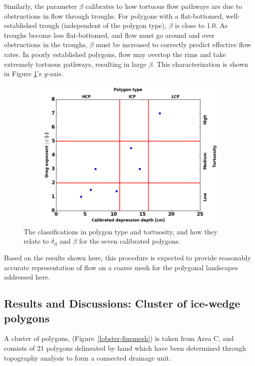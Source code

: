 \documentclass[review,11pt]{elsarticle}
\begin{document}
Similarly, the parameter $\beta$ calibrates to how tortuous flow pathways are due to obstructions in flow through troughs.
For polygons with a flat-bottomed, well-established trough (independent of the polygon type), $\beta$ is close to 1.0.
As troughs become less flat-bottomed, and flow must go around and over obstructions in the troughs, $\beta$ must be increased to correctly predict effective flow rates.
In poorly established polygons, flow may overtop the rims and take extremely tortuous pathways, resulting in large $\beta$.
This characterization is shown in Figure \ref{beta-classification}'s $y$-axis.
%
\begin{figure}[!h]
\centering
\includegraphics[width=11cm,height=7.5cm]
{./figures/new-model/beta-classification-3.png}
\caption{The classifications in polygon type and tortuosity, and how they relate to $\delta_{\text{d}}$ and $\beta$ for the seven calibrated polygons.}
\label{beta-classification}
\end{figure}

Based on the results shown here, this procedure is expected to provide reasonably accurate representation of flow on a coarse mesh for the polygonal landscapes addressed here. 




%
\FloatBarrier
\subsection{Results and Discussions: Cluster of ice-wedge polygons}\label{numerical-tests-cluster}
A cluster of polygons, (Figure~\ref{lobster-finemesh}) is taken from Area C, and consists of 21 polygons delineated by hand which have been determined through topography analysis to form a connected drainage unit.
\end{document}
